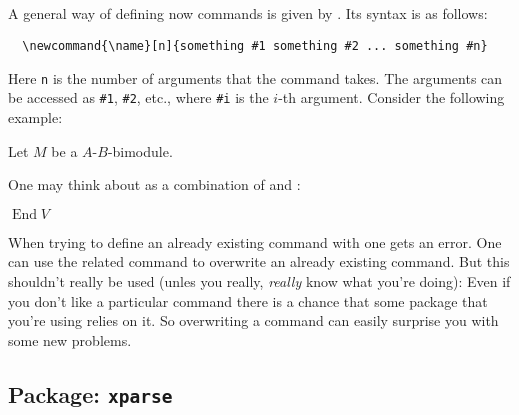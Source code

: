 \documentclass[a4paper, 10pt, abstract=on, headings=standardclasses]{scrartcl}
\begin{document}
\subsection{}

A general way of defining now commands is given by .
Its syntax is as follows:
\begin{lstlisting}
  \newcommand{\name}[n]{something #1 something #2 ... something #n}
\end{lstlisting}
Here \texttt{n} is the number of arguments that the command takes.
The arguments can be accessed as \texttt{\#1}, \texttt{\#2}, etc., where \texttt{\#i} is the $i$-th argument.
Consider the following example:
\begin{LTXexample}[pos = b]
  \newcommand{\bimodule}[2]{#1-#2-bimodule}
  Let $M$ be a \bimodule{$A$}{$B$}.
\end{LTXexample}
One may think about  as a combination of  and :
\begin{LTXexample}[pos = b]
  \newcommand{\End}{\operatorname{End}}
  $\End V$
\end{LTXexample}

When trying to define an already existing command with  one gets an error.
One can use the related command  to overwrite an already existing command.
But this shouldn’t really be used (unles you really, \emph{really} know what you’re doing):
Even if you don’t like a particular command there is a chance that some package that you’re using relies on it.
So overwriting a command can easily surprise you with some new problems.



\subsection{Package: \texttt{xparse}}
\end{document}
